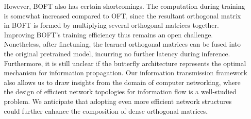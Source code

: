 However, BOFT also has certain shortcomings. The computation during training is somewhat increased compared to OFT, since the resultant orthogonal matrix in BOFT is formed by multiplying several orthogonal matrices together. Improving BOFT's training efficiency thus remains an open challenge. Nonetheless, after finetuning, the learned orthogonal matrices can be fused into the original pretrained model, incurring no further latency during inference. Furthermore, it is still unclear if the butterfly architecture represents the optimal mechanism for information propagation. Our information transmission framework also allows us to draw insights from the domain of computer networking, where the design of efficient network topologies for information flow is a well-studied problem. We anticipate that adopting even more efficient network structures could further enhance the composition of dense orthogonal matrices.